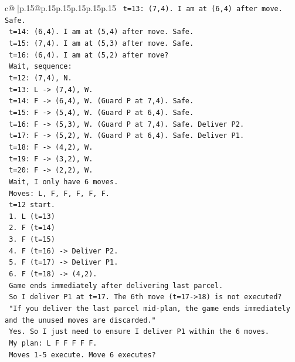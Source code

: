 \documentclass{article}
\begin{document}
{\begin{supertabular}{c@{$\;$}|p{.15\linewidth}@{}p{.15\linewidth}p{.15\linewidth}p{.15\linewidth}p{.15\linewidth}p{.15\linewidth}}
{{{\texttt{   t=13: (7,4). I am at (6,4) after move. Safe.} \\
\texttt{   t=14: (6,4). I am at (5,4) after move. Safe.} \\
\texttt{   t=15: (7,4). I am at (5,3) after move. Safe.} \\
\texttt{   t=16: (6,4). I am at (5,2) after move?} \\
\texttt{   Wait, sequence:} \\
\texttt{   t=12: (7,4), N.} \\
\texttt{   t=13: L {-}> (7,4), W.} \\
\texttt{   t=14: F {-}> (6,4), W. (Guard P at 7,4). Safe.} \\
\texttt{   t=15: F {-}> (5,4), W. (Guard P at 6,4). Safe.} \\
\texttt{   t=16: F {-}> (5,3), W. (Guard P at 7,4). Safe. Deliver P2.} \\
\texttt{   t=17: F {-}> (5,2), W. (Guard P at 6,4). Safe. Deliver P1.} \\
\texttt{   t=18: F {-}> (4,2), W.} \\
\texttt{   t=19: F {-}> (3,2), W.} \\
\texttt{   t=20: F {-}> (2,2), W.} \\
\texttt{   Wait, I only have 6 moves.} \\
\texttt{   Moves: L, F, F, F, F, F.} \\
\texttt{   t=12 start.} \\
\texttt{   1. L (t=13)} \\
\texttt{   2. F (t=14)} \\
\texttt{   3. F (t=15)} \\
\texttt{   4. F (t=16) {-}> Deliver P2.} \\
\texttt{   5. F (t=17) {-}> Deliver P1.} \\
\texttt{   6. F (t=18) {-}> (4,2).} \\
\texttt{   Game ends immediately after delivering last parcel.} \\
\texttt{   So I deliver P1 at t=17. The 6th move (t=17{-}>18) is not executed?} \\
\texttt{   "If you deliver the last parcel mid{-}plan, the game ends immediately and the unused moves are discarded."} \\
\texttt{   Yes. So I just need to ensure I deliver P1 within the 6 moves.} \\
\texttt{   My plan: L F F F F F.} \\
\texttt{   Moves 1{-}5 execute. Move 6 executes?} \\
}}}
\end{supertabular}}
\end{document}

